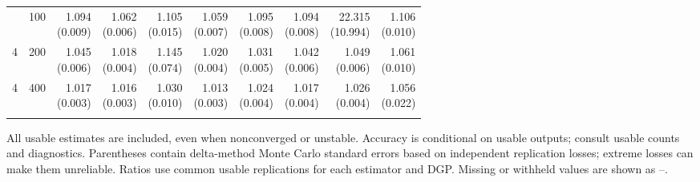\begin{table}[p]
{\begin{tabular}{llrrrrrrrr}
\addlinespace
4 & 100 & \shortstack{1.094\\(0.009)} & \shortstack{1.062\\(0.006)} & \shortstack{1.105\\(0.015)} & \shortstack{1.059\\(0.007)} & \shortstack{1.095\\(0.008)} & \shortstack{1.094\\(0.008)} & \shortstack{22.315\\(10.994)} & \shortstack{1.106\\(0.010)} \\
4 & 200 & \shortstack{1.045\\(0.006)} & \shortstack{1.018\\(0.004)} & \shortstack{1.145\\(0.074)} & \shortstack{1.020\\(0.004)} & \shortstack{1.031\\(0.005)} & \shortstack{1.042\\(0.006)} & \shortstack{1.049\\(0.006)} & \shortstack{1.061\\(0.010)} \\
4 & 400 & \shortstack{1.017\\(0.003)} & \shortstack{1.016\\(0.003)} & \shortstack{1.030\\(0.010)} & \shortstack{1.013\\(0.003)} & \shortstack{1.024\\(0.004)} & \shortstack{1.017\\(0.004)} & \shortstack{1.026\\(0.004)} & \shortstack{1.056\\(0.022)} \\
\addlinespace
\bottomrule\end{tabular}}
\par\medskip
\begin{minipage}{\linewidth}\footnotesize All usable estimates are included, even when nonconverged or unstable. Accuracy is conditional on usable outputs; consult usable counts and diagnostics. Parentheses contain delta-method Monte Carlo standard errors based on independent replication losses; extreme losses can make them unreliable. Ratios use common usable replications for each estimator and DGP.  Missing or withheld values are shown as --.\end{minipage}
\end{table}
